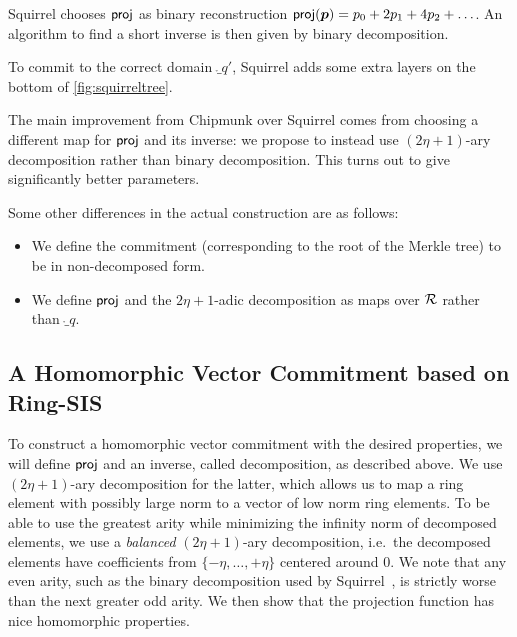 Squirrel chooses $\mathsf{proj}$ as binary reconstruction $\mathsf{proj}(\boldsymbol{p}) = p_0 + 2p_1 + 4p_2 + \ldots$.
An algorithm to find a short inverse is then given by binary decomposition.

To commit to the correct domain $\ring_{q'}$, Squirrel adds some extra layers on the bottom of \autoref{fig:squirreltree}.

The main improvement from Chipmunk over Squirrel comes from choosing a different map for $\mathsf{proj}$ and its inverse: we propose to instead use $(2\eta+1)$-ary decomposition rather than binary decomposition.
This turns out to give significantly better parameters.

Some other differences in the actual construction are as follows:
\begin{itemize}
 \item We define the commitment (corresponding to the root of the Merkle tree) to be in non-decomposed form.
 \item We define $\mathsf{proj}$ and the $2\eta+1$-adic decomposition as maps over $\mathcal{R}$ rather than $\ring_q$.
\end{itemize}

\subsection{A Homomorphic Vector Commitment based on Ring-SIS}\label{sec:our_hvc_construction}
To construct a homomorphic vector commitment with the desired properties, we will define $\mathsf{proj}$ and an inverse, called decomposition, as described above.
We use $(2\eta+1)$-ary decomposition for the latter, which allows us to map a ring element with possibly large norm to a vector of low norm ring elements.
To be able to use the greatest arity while minimizing the infinity norm of decomposed elements, we use a \emph{balanced} $(2\eta+1)$-ary decomposition, i.e.\ the decomposed elements have coefficients from $\{-\eta,\ldots,+\eta\}$ centered around 0.
We note that any even arity, such as the binary decomposition used by Squirrel~\cite{CCS:FleSimZha22}, is strictly worse than the next greater odd arity.
We then show that the projection function has nice homomorphic properties.

